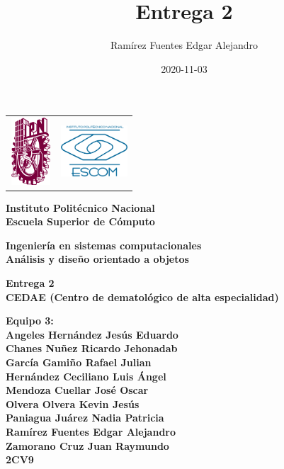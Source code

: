 \documentclass[12pt,letterpaper]{article}
\author{Ram\'irez Fuentes Edgar Alejandro}
\title{Entrega 2}
\date {2020-11-03}
\begin{document}
	\pagestyle{plain}
	{
		{
			\begin{tabular}
				{
					p{} 
					p{} 
				}
				\includegraphics[width=1.5cm, height=2.5cm]{ipn.png} &  
				\includegraphics[width=2.5cm, height=2cm]{escom.png}
			\end{tabular}
		}
		\begin{center}
			\par\vspace{1cm} %
			{
				\Huge\textbf
				{
					Instituto Polit\'ecnico Nacional 
					\\[.2cm]Escuela Superior de C\'omputo
				}
			}
			\par\vspace{0.5cm}
			{
				\Large\textbf
				{
					Ingenier\'ia en sistemas computacionales 
					\\[.5cm]An\'alisis y diseño orientado a objetos
				}
			}
			\vfill
			\par\vspace{0.5cm}
			{
				\Large\textbf
				{
					Entrega 2 \\
					CEDAE (Centro de dematológico de alta especialidad)
				}
			}
			\vfill
			\par\vspace{1cm}
			{
				\large\textbf
				{
                    Equipo 3:
                    \\Angeles Hernández Jesús Eduardo
                    \\Chanes Nuñez Ricardo Jehonadab
                    \\García Gamiño Rafael Julian
                    \\Hernández Ceciliano Luis Ángel
                    \\Mendoza Cuellar José Oscar
                    \\Olvera Olvera Kevin Jesús
                    \\Paniagua Juárez Nadia Patricia
                    \\Ramírez Fuentes Edgar Alejandro
                    \\Zamorano Cruz Juan Raymundo
					\\2CV9
				} 
			}
			\par\vspace{3cm}
		\end{center}
		\clearpage
	}
\end{document}

